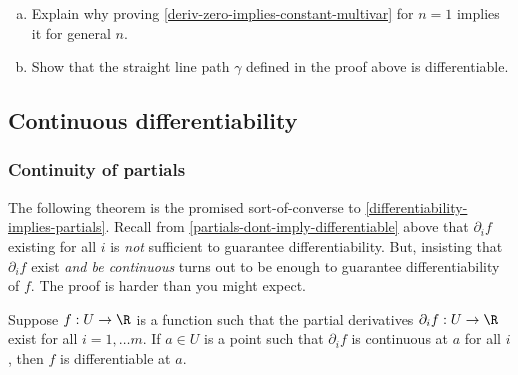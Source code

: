 \begin{exercise} \label{deriv-zero-implies-constant-multivar-details}
	 \begin{enumerate}[(a)]
	 	\item Explain why proving \cref{deriv-zero-implies-constant-multivar} for $n = 1$ implies it for general $n$. 
	 	\item Show that the straight line path $\gamma$ defined in the proof above is differentiable. 
	 \end{enumerate}
\end{exercise}

\subsection{Continuous differentiability}

\subsubsection*{Continuity of partials}

The following theorem is the promised sort-of-converse to \cref{differentiability-implies-partials}. Recall from \cref{partials-dont-imply-differentiable} above that $\partial_i f$ existing for all $i$ is \emph{not} sufficient to guarantee differentiability. But, insisting that $\partial_i f$ exist \emph{and be continuous} turns out to be enough to guarantee differentiability of $f$. The proof is harder than you might expect. 

\begin{theorem} \label{continuous-partials}
	Suppose $f : U \to \R$ is a function such that the partial derivatives $\partial_i f : U \to \R$ exist for all $i = 1 , \dotsc m$. If $a \in U$ is a point such that $\partial_i f$ is continuous at $a$ for all $i$, then $f$ is differentiable at $a$. 
\end{theorem}

